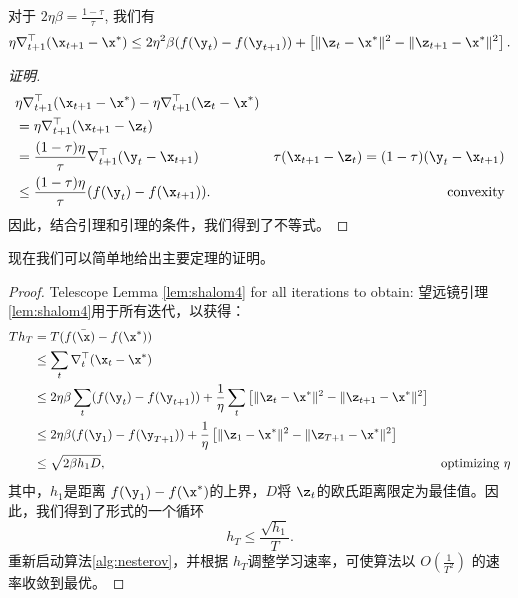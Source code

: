 \begin{lemma} \label{lem:shalom4}
对于 $2 {\eta \beta} = \frac{1 - \tau}{\tau}$, 我们有
$$ \eta \nabla_{t+1}^\top ( \x_{t+1} - \x^*)  \leq 2 \eta^2 {\beta} (f(\y_t )- f(\y_{t+1}) ) +  \left[ \| \z_t - \x^*\|^2 - \| \z_{t+1} -\x^*\|^2 \right] . $$
\end{lemma}
\begin{proof}[证明]
\begin{eqnarray*}
& \eta  \nabla_{t+1}^\top  ( \x_{t+1} - \x^*) - \eta  \nabla_{t+1}^\top  ( \z_{t} - \x^*) \\
& = \eta  \nabla_{t+1}^\top  ( \x_{t+1} - \z_t ) \\
& = \frac{(1 - \tau) \eta}{\tau}  \nabla_{t+1}^\top  ( \y_t - \x_{t+1} ) &  \tau(\x_{t+1} - \z_t) = (1-\tau) (\y_t - \x_{t+1}) \\
& \leq \frac{(1 - \tau) \eta}{\tau} ( f(  \y_t ) - f( \x_{t+1} )) . &  \mbox{ convexity}
\end{eqnarray*}
因此，结合引理和引理的条件，我们得到了不等式。
\end{proof}

现在我们可以简单地给出主要定理的证明。
\begin{proof}
Telescope Lemma \ref{lem:shalom4} for all iterations to obtain:
望远镜引理\ref{lem:shalom4}用于所有迭代，以获得：
\begin{eqnarray*}
T h_T & = T ( f(\bar{\x}) - f(\x^*)) \\ 
 & \leq  \sum_t \nabla_t^\top (\x_t - \x^*) \\
& \leq 2 \eta  {\beta} \sum_t (f(\y_t )- f(\y_{t+1}) ) +  \frac{1}{\eta} \sum_t \left[ \| \z_t - \x^*\|^2 - \| \z_{t+1} -\x^*\|^2 \right] \\
& \leq  2 \eta  {\beta}  (f(\y_1 )- f(\y_{T+1}) ) +  \frac{1}{\eta}  \left[ \| \z_1 - \x^*\|^2 - \| \z_{T+1} -\x^*\|^2 \right] \\
& \leq  \sqrt{2  \beta  h_1  D} , & \mbox{optimizing $\eta$}
\end{eqnarray*}
其中，$h_1$是距离 $f(\y_1) - f(\x^*)$的上界，$D$将 $\z_t$的欧氏距离限定为最佳值。因此，我们得到了形式的一个循环
$$ h_T \leq \frac{\sqrt{h_1}}{T} .$$
重新启动算法\ref{alg:nesterov}，并根据 $h_T$调整学习速率，可使算法以 $O(\frac{1}{T^2})$ 的速率收敛到最优。
\end{proof}








